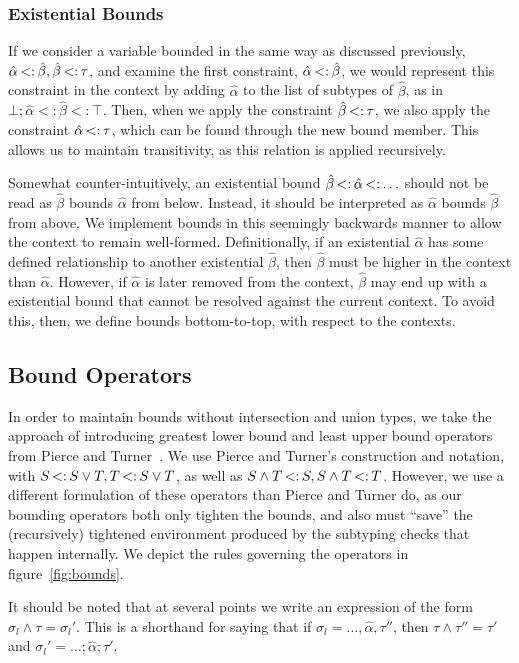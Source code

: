 \documentclass{sig-alternate}
\newcommand{\st}{\ensuremath{\hspace{-1px}<:\hspace{-1px}}}
\newcommand{\alphahat}{\hat{\alpha}}
\newcommand{\betahat}{\hat{\beta}}
\newcommand{\botbound}{\sigma_{l}}
\newcommand{\lub}{\ensuremath{\vee}}
\newcommand{\glb}{\ensuremath{\wedge}}
\newcommand{\ctxbsep}{;}
\newcommand{\tst}{{\scriptstyle{<:}}}
\newcommand{\bound}[3]{#1 \tst #2 \tst #3}
\begin{document}
\subsubsection{Existential Bounds}
If we consider a variable bounded in the same way as discussed previously, $\hat{\alpha} \st \hat{\beta}, \hat{\beta} \st \tau$, and examine the first constraint, $\hat{\alpha} \st \hat{\beta}$, we would represent this constraint in the context by adding $\hat{\alpha}$ to the list of subtypes of $\hat{\beta}$, as in $\bound{\bot\ctxbsep \hat{\alpha}}{\hat{\beta}}{\top}$. Then, when we apply the constraint $\hat{\beta} \st \tau$, we also apply the constraint $\hat{\alpha}\st \tau$, which can be found through the new bound member. This allows us to maintain transitivity, as this relation is applied recursively.

Somewhat counter-intuitively, an existential bound $\betahat \st \alphahat \st \ldots$ should not be read as $\betahat$ bounds $\alphahat$ from below. Instead, it should be interpreted as $\alphahat$ bounds $\betahat$ from above. We implement bounds in this seemingly backwards manner to allow the context to remain well-formed. Definitionally, if an existential $\alphahat$ has some defined relationship to another existential $\betahat$, then $\betahat$ must be higher in the context than $\alphahat$. However, if $\alphahat$ is later removed from the context, $\betahat$ may end up with a existential bound that cannot be resolved against the current context. To avoid this, then, we define bounds bottom-to-top, with respect to the contexts.
 
\subsection{Bound Operators}
In order to maintain bounds without intersection and union types, we take the approach of introducing greatest lower bound and least upper bound operators from Pierce and Turner~\cite{Pierce:2000:LTI:345099.345100}. We use Pierce and Turner's construction and notation, with $S \st S \lub T, T \st S \lub T$, as well as $S \glb T \st S, S \glb T \st T$. However, we use a different formulation of these operators than Pierce and Turner do, as our bounding operators both only tighten the bounds, and also must ``save'' the (recursively) tightened environment produced by the subtyping checks that happen internally. We depict the rules governing the operators in figure~\ref{fig:bounds}.


It should be noted that at several points we write an expression of the form $\botbound\glb \tau = \botbound'$. This is a shorthand for saying that if $\botbound=\ldots, \hat{\alpha}, \tau''$, then $ \tau \glb \tau'' = \tau'$ and $\botbound' = \ldots\ctxbsep\hat{\alpha}\ctxbsep\tau'$.
\end{document}
